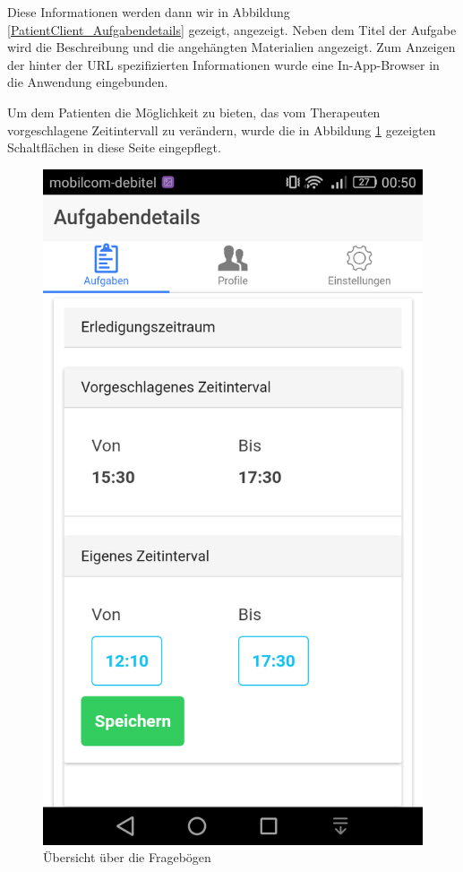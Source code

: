 Diese Informationen werden dann wir in Abbildung \ref{PatientClient_Aufgabendetails} gezeigt, angezeigt. Neben dem Titel der Aufgabe wird die Beschreibung und die angehängten Materialien angezeigt. Zum Anzeigen der hinter der URL spezifizierten Informationen wurde eine In-App-Browser in die Anwendung eingebunden.

Um dem Patienten die Möglichkeit zu bieten, das vom Therapeuten vorgeschlagene Zeitintervall zu verändern, wurde die in Abbildung \ref{PatientClient_AufgabendetailsZeit} gezeigten Schaltflächen in diese Seite eingepflegt.
\begin{figure}[H]
	\centering
	\includegraphics[scale=0.25]{images/Screenshots/PatientClient/AufgabendetailsZeit}
	\caption[Übersicht über die Fragebögen]{Übersicht über die Fragebögen}
	\label{PatientClient_AufgabendetailsZeit}
\end{figure}
